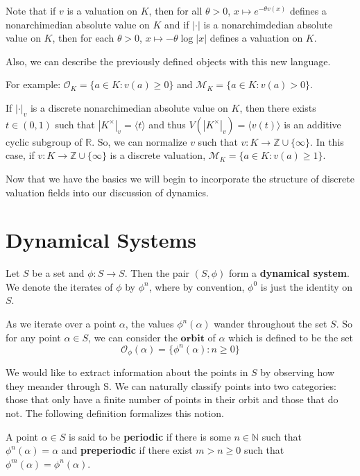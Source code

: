 \documentclass[12pt]{amsart}
\theoremstyle{definition}
\theoremstyle{remark}
\theoremstyle{definition}
\newcommand{\MCM}{\mathcal{M}}
\newcommand{\MCO}{\mathcal{O}}
\begin{document}
Note that if $v$ is a valuation on $K$, then for all $\theta >0$, $x \mapsto e^{-\theta v(x)}$ defines a nonarchimedian absolute value on $K$  and if $|\cdot |$ is a nonarchimdedian absolute value on $K$, then for each $\theta >0$, $x \mapsto -\theta \log |x|$ defines a valuation on $K$. 

Also, we can describe the previously defined objects with this new language. 

For example: $\MCO_K=\{a \in K : v(a)\geq 0\}$ and $\MCM_K=\{a \in K : v(a) > 0\}$. 

If $|\cdot|_v$ is a discrete nonarchimedian absolute value on $K$, then there exists $t \in (0,1)$ such that $|K^{\times}|_v=\langle t \rangle$ and thus $V(|K^{\times}|_v)= \langle v(t) \rangle$ is an additive cyclic subgroup of $\mathbb{R}$.   So, we can normalize $v$ such that $v: K \rightarrow \mathbb{Z} \cup \{\infty\}$.
In this case, if $v: K \rightarrow \mathbb{Z} \cup \{\infty \}$ is a discrete valuation, 
$\MCM_K=\{a \in K : v(a) \geq 1\}$.

Now that we have the basics we will begin to incorporate the structure of discrete valuation fields into our discussion of dynamics. 

\section{Dynamical Systems}

Let $S$ be a set and $\phi: S \to S$. Then the pair $(S,\phi)$ form a \textbf{dynamical system}. We denote the iterates of $\phi$ by $\phi^{n}$, where by convention, $\phi^{0}$ is just the identity on $S$. 

As we iterate over a point $\alpha$, the values $\phi^{n}(\alpha)$ wander throughout the set $S$. So for any point $\alpha \in S$, we can consider the $\textbf{orbit}$ of $\alpha$ which is defined to be the set \begin{equation}
\mathcal{O}_{\phi}(\alpha) = \{\phi^{n}(\alpha): n \geq 0\}
\end{equation}

\noindent We would like to extract information about the points in $S$ by observing how they meander through S. We can naturally classify points into two categories: those that only have a finite number of points in their orbit and those that do not. The following definition formalizes this notion.

A point $\alpha \in S$ is said to be \textbf{periodic} if there is some $n \in \mathbb{N}$ such that $\phi^{n}(\alpha) = \alpha$ and \textbf{preperiodic} if there exist $m > n \geq 0$ such that $\phi^{m}(\alpha) = \phi^{n}(\alpha)$.
\end{document}
